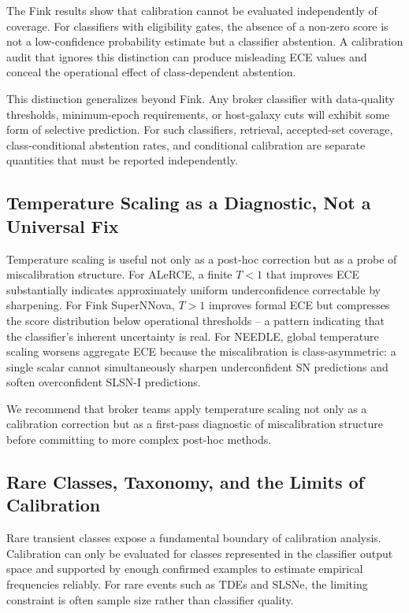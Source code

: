 \documentclass[twocolumn]{aastex631}
\begin{document}
The Fink results show that calibration cannot be evaluated
independently of coverage. For classifiers with eligibility gates,
the absence of a non-zero score is not a low-confidence probability
estimate but a classifier abstention. A calibration audit that
ignores this distinction can produce misleading ECE values and
conceal the operational effect of class-dependent abstention.

This distinction generalizes beyond Fink. Any broker classifier
with data-quality thresholds, minimum-epoch requirements, or
host-galaxy cuts will exhibit some form of selective prediction.
For such classifiers, retrieval, accepted-set coverage,
class-conditional abstention rates, and conditional calibration
are separate quantities that must be reported independently.

\subsection{Temperature Scaling as a Diagnostic, Not a Universal
Fix}\label{sec:disc_tempscaling}

Temperature scaling is useful not only as a post-hoc correction
but as a probe of miscalibration structure. For ALeRCE, a finite
$T < 1$ that improves ECE substantially indicates approximately
uniform underconfidence correctable by sharpening. For Fink
SuperNNova, $T > 1$ improves formal ECE but compresses the score
distribution below operational thresholds -- a pattern indicating
that the classifier's inherent uncertainty is real. For NEEDLE,
global temperature scaling worsens aggregate ECE because the
miscalibration is class-asymmetric: a single scalar cannot
simultaneously sharpen underconfident SN predictions and soften
overconfident SLSN-I predictions.

We recommend that broker teams apply temperature scaling not only
as a calibration correction but as a first-pass diagnostic of
miscalibration structure before committing to more complex
post-hoc methods.

\subsection{Rare Classes, Taxonomy, and the Limits of
Calibration}\label{sec:disc_rare}

Rare transient classes expose a fundamental boundary of
calibration analysis. Calibration can only be evaluated for
classes represented in the classifier output space and supported
by enough confirmed examples to estimate empirical frequencies
reliably. For rare events such as TDEs and SLSNe, the limiting
constraint is often sample size rather than classifier quality.
\end{document}
